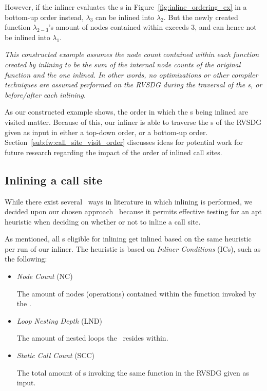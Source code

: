 However, if the inliner evaluates the \applyNode s in
Figure~\ref{fig:inline_ordering_ex} in a bottom-up order instead, $\lambda_3$
can be inlined into $\lambda_2$. But the newly created function
$\lambda_{2-3}$'s amount of nodes contained within exceeds 3, and can hence not
be inlined into $\lambda_1$.

\textit{This constructed example assumes the node count contained within each
function created by inlining to be the sum of the internal node counts of the
original function and the one inlined. In other words, no optimizations or other
compiler techniques are assumed performed on the RVSDG during the traversal of
the \applyNode s, or before/after each inlining.}

As our constructed example shows, the order in which the \applyNode s being
inlined are visited matter. Because of this, our inliner is able to traverse the
\applyNode s of the RVSDG given as input in either a top-down order, or a
bottom-up order. Section~\ref{sub:fw:call_site_visit_order} discusses
ideas for potential work for future research regarding the impact of the order
of inlined call sites.

\subsection{Inlining a call site}
\label{sub:scheme:inlining_apply_nodes}

While there exist several~\cite{GHCPaper,AdaptvStratInlSubst} ways in
literature in which inlining is performed, we decided upon our chosen
approach~\cite{AdaptvCompilAndInlingWaterman} because it permits effective
testing for an apt heuristic when deciding on whether or not to inline a call
site.

As mentioned, all \applyNode s eligible for inlining get inlined based on the
same heuristic per run of our inliner. The heuristic is based on \textit{Inliner
Conditions} (ICs), such as the following:

\begin{itemize}
	\item \textit{Node Count} (NC)

The amount of nodes (operations) contained within the function invoked by the
\applyNode .

	\item \textit{Loop Nesting Depth} (LND)

The amount of nested loops the \applyNode~resides within.

	\item \textit{Static Call Count} (SCC)

The total amount of \applyNode s invoking the same function in the RVSDG given
as input.
\end{itemize}

